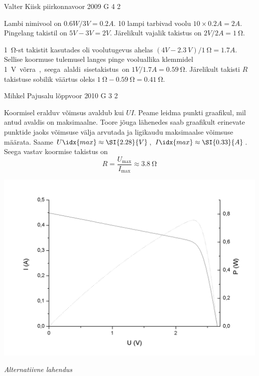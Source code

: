 \documentclass[11pt]{article}
\begin{document}
{%
{Valter Kiisk} %
{piirkonnavoor} %
{2009} %
{G 4} %
{2} %
{

\ifSolution
\osa Lambi nimivool on $\SI{0,6}W/\SI{3}V=\SI{0,2}A$. 10
lampi tarbivad voolu $10\times \SI{0,2}A=\SI{2}A$. Pingelang takistil on $\SI{5}V-\SI{3}V=\SI{2}V$. Järelikult vajalik takistus on $\SI{2}V/\SI{2}A=\SI{1}{\ohm}$.

\osa \SI{1}{\ohm}-st takistit kasutades oli voolutugevus ahelas $(\SI{4}V-\SI{2,3}{V})/\SI{1}{\ohm}=\SI{1,7}A$. Sellise koormuse tulemusel langes pinge vooluallika
klemmidel \SI{1}V võrra, seega alaldi sisetakistus on $\SI{1}V/\SI{1,7}A=\SI{0,59}{\ohm}$. Järelikult takisti $R$ takistuse sobilik väärtus oleks
$\SI{1}{\ohm}-\SI{0,59}{\ohm}=\SI{0,41}{\ohm}$.
\fi
}

{Mihkel Pajusalu} %
{lõppvoor} %
{2010} %
{G 3} %
{2} %
{

\ifSolution
Koormisel eralduv võimsus avaldub kui $UI$. Peame leidma punkti graafikul, mil antud avaldis on maksimaalne. Toore jõuga lähenedes saab graafikult erinevate punktide jaoks võimsuse välja arvutada ja ligikaudu maksimaalse võimsuse määrata. Saame $U\idx{max} \approx \SI{2.28}{V}$, $I\idx{max}\approx \SI{0.33}{A}$. Seega vastav koormise takistus on
\[
R = \frac{U_\mathrm{max}}{I_\mathrm{max}} \approx \SI{3.8}{\ohm}
\]


\begin{center}
	\vspace{-0.1cm}
	\includegraphics[width=0.8\linewidth]{2010-v3g-03-paneel_lah.png}
\end{center}

\textit{Alternatiivne lahendus}\\

}}
\end{document}
